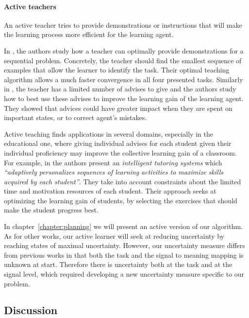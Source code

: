 \paragraph{Active teachers}

An active teacher tries to provide demonstrations or instructions that will make the learning process more efficient for the learning agent. 

In \cite{cakmak2012algorithmic}, the authors study how a teacher can optimally provide demonstrations for a sequential problem. Concretely, the teacher should find the smallest sequence of examples that allow the learner to identify the task. Their optimal teaching algorithm allows a much faster convergence in all four presented tasks. Similarly in \cite{torrey2013teaching}, the teacher has a limited number of advises to give and the authors study how to best use these advises to improve the learning gain of the learning agent. They showed that advices could have greater impact when they are spent on important states, or to correct agent's mistakes.

Active teaching finds applications in several domains, especially in the educational one, where giving individual advises for each student given their individual proficiency may improve the collective learning gain of a classroom. For example, in \cite{clement2014online} the authors present an \emph{intelligent tutoring systems} which \textit{``adaptively personalizes sequences of learning activities to maximize skills acquired by each student''}. They take into account constraints about the limited time and motivation resources of each student. Their approach seeks at optimizing the learning gain of students, by selecting the exercises that should make the student progress best.
 
\transition

In chapter~\ref{chapter:planning} we will present an active version of our algorithm. As for other works, our active learner will seek at reducing uncertainty by reaching states of maximal uncertainty. However, our uncertainty measure differs from previous works in that both the task and the signal to meaning mapping is unknown at start. Therefore there is uncertainty both at the task and at the signal level, which required developing a new uncertainty measure specific to our problem.

\subsection{Discussion}

